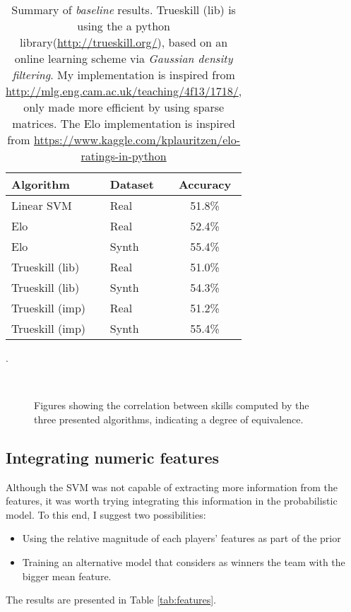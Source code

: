 \documentclass[10pt,a4]{article}
\begin{document}
\begin{table}[h!]
  \centering
  \begin{tabular}{l l c}
    \textbf{Algorithm} & \textbf{Dataset} &  \textbf{Accuracy} \\ 
    \hline
    Linear SVM         & Real             &  51.8\% \\
    \hline
    Elo                & Real             &  52.4\% \\
    Elo                & Synth            &  55.4\% \\
    \hline
    Trueskill (lib)    & Real             &  51.0\% \\
    Trueskill (lib)    & Synth            &  54.3\% \\
    \hline
    Trueskill (imp)    & Real             &  51.2\% \\
    Trueskill (imp)    & Synth            &  55.4\% \\    
    \hline 
  \end{tabular}
  \caption{Summary of \emph{baseline} results. Trueskill (lib) is using the 
  a python library(\url{http://trueskill.org/}), based on an online learning scheme 
  via \emph{Gaussian density filtering}\cite{minka2001expectation}. My implementation
  is inspired from \url{http://mlg.eng.cam.ac.uk/teaching/4f13/1718/}, only made 
  more efficient by using sparse matrices. The Elo implementation is inspired from 
  \url{https://www.kaggle.com/kplauritzen/elo-ratings-in-python}}.   
  \label{tab:results}
\end{table}

\begin{figure}[h!]
  \centering
  \mbox{
      \quad
  }
  \caption{Figures showing the correlation between skills computed by the three 
  presented algorithms, indicating a degree of equivalence.}
\end{figure}


\subsection{Integrating numeric features}

Although the SVM was not capable of extracting more information from the features, 
it was worth trying integrating this information in the probabilistic model. 
To this end, I suggest two possibilities:
\begin{itemize}
  \item Using the relative magnitude of each players' features as part of the prior
  \item Training an alternative model that considers as winners the team with the 
  bigger mean feature. 
\end{itemize}
The results are presented in Table \ref{tab:features}.
\end{document}
